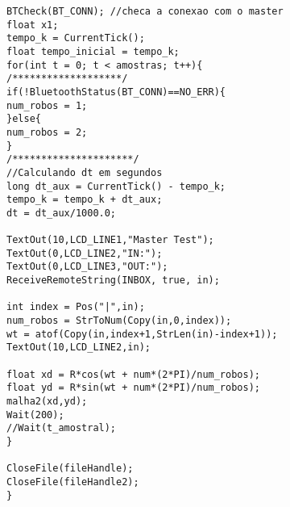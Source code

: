 \begin{apendicesenv}
\begin{lstlisting}
BTCheck(BT_CONN); //checa a conexao com o master
float x1;
tempo_k = CurrentTick();
float tempo_inicial = tempo_k;
for(int t = 0; t < amostras; t++){
/*******************/
if(!BluetoothStatus(BT_CONN)==NO_ERR){
num_robos = 1;
}else{
num_robos = 2;
}
/*********************/
//Calculando dt em segundos
long dt_aux = CurrentTick() - tempo_k;
tempo_k = tempo_k + dt_aux;
dt = dt_aux/1000.0;

TextOut(10,LCD_LINE1,"Master Test");
TextOut(0,LCD_LINE2,"IN:");
TextOut(0,LCD_LINE3,"OUT:");
ReceiveRemoteString(INBOX, true, in);

int index = Pos("|",in);
num_robos = StrToNum(Copy(in,0,index));
wt = atof(Copy(in,index+1,StrLen(in)-index+1));
TextOut(10,LCD_LINE2,in);

float xd = R*cos(wt + num*(2*PI)/num_robos);
float yd = R*sin(wt + num*(2*PI)/num_robos);
malha2(xd,yd);
Wait(200);
//Wait(t_amostral);
}

CloseFile(fileHandle);
CloseFile(fileHandle2);
}
\end{lstlisting}
\end{apendicesenv}
